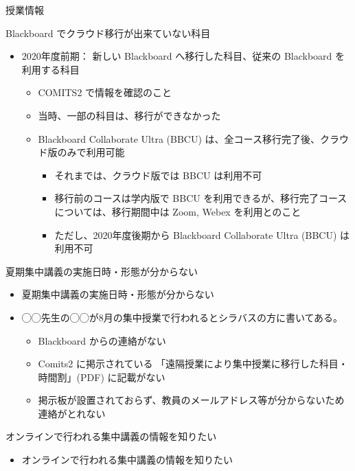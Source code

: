 \documentclass[a4j,10pt]{jsarticle}
\begin{document}
{\newpage\clearpage
{}%
\begin{frame}[label={sec:orgfb54576},fragile]{授業情報}
\begin{block}{Blackboard でクラウド移行が出来ていない科目}
\begin{itemize}
\item 2020年度前期： 新しい Blackboard へ移行した科目、従来の Blackboard を利用する科目
\begin{itemize}
\item COMITS2 で情報を確認のこと
\item 当時、一部の科目は、移行ができなかった
\item Blackboard Collaborate Ultra (BBCU) は、全コース移行完了後、クラウド版のみで利用可能
\begin{itemize}
\item それまでは、クラウド版では BBCU は利用不可
\item 移行前のコースは学内版で BBCU を利用できるが、移行完了コースについては、移行期間中は Zoom, Webex を利用とのこと
\item ただし、2020年度後期から Blackboard Collaborate Ultra (BBCU) は利用不可
\end{itemize}
\end{itemize}
\end{itemize}
\end{block}
\par
\begin{block}{夏期集中講義の実施日時・形態が分からない}
\begin{itemize}
\item 夏期集中講義の実施日時・形態が分からない
\item ◯◯先生の◯◯が8月の集中授業で行われるとシラバスの方に書いてある。
\begin{itemize}
\item Blackboard からの連絡がない
\item Comits2 に掲示されている 「遠隔授業により集中授業に移行した科目・時間割」(PDF) に記載がない
\item 掲示板が設置されておらず、教員のメールアドレス等が分からないため連絡がとれない
\end{itemize}
\end{itemize}
\end{block}
\par
\begin{block}{オンラインで行われる集中講義の情報を知りたい}
\begin{itemize}
\item オンラインで行われる集中講義の情報を知りたい

\end{itemize}
\end{block}
\end{frame}}
\end{document}
